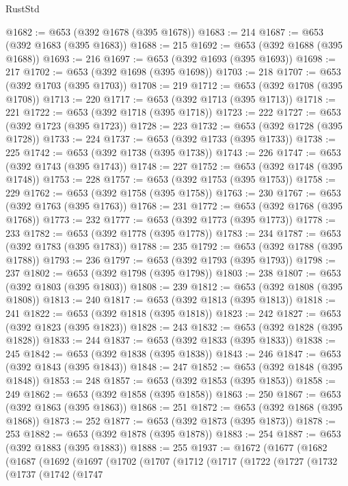 \begin{lexlean}{RustStd}
\begin{coremodule}
{\begin{coremodule}
{{{{{{{{{{{{@1682 := @653 (@392 @1678 (@395 @1678))
@1683 := 214
@1687 := @653 (@392 @1683 (@395 @1683))
@1688 := 215
@1692 := @653 (@392 @1688 (@395 @1688))
@1693 := 216
@1697 := @653 (@392 @1693 (@395 @1693))
@1698 := 217
@1702 := @653 (@392 @1698 (@395 @1698))
@1703 := 218
@1707 := @653 (@392 @1703 (@395 @1703))
@1708 := 219
@1712 := @653 (@392 @1708 (@395 @1708))
@1713 := 220
@1717 := @653 (@392 @1713 (@395 @1713))
@1718 := 221
@1722 := @653 (@392 @1718 (@395 @1718))
@1723 := 222
@1727 := @653 (@392 @1723 (@395 @1723))
@1728 := 223
@1732 := @653 (@392 @1728 (@395 @1728))
@1733 := 224
@1737 := @653 (@392 @1733 (@395 @1733))
@1738 := 225
@1742 := @653 (@392 @1738 (@395 @1738))
@1743 := 226
@1747 := @653 (@392 @1743 (@395 @1743))
@1748 := 227
@1752 := @653 (@392 @1748 (@395 @1748))
@1753 := 228
@1757 := @653 (@392 @1753 (@395 @1753))
@1758 := 229
@1762 := @653 (@392 @1758 (@395 @1758))
@1763 := 230
@1767 := @653 (@392 @1763 (@395 @1763))
@1768 := 231
@1772 := @653 (@392 @1768 (@395 @1768))
@1773 := 232
@1777 := @653 (@392 @1773 (@395 @1773))
@1778 := 233
@1782 := @653 (@392 @1778 (@395 @1778))
@1783 := 234
@1787 := @653 (@392 @1783 (@395 @1783))
@1788 := 235
@1792 := @653 (@392 @1788 (@395 @1788))
@1793 := 236
@1797 := @653 (@392 @1793 (@395 @1793))
@1798 := 237
@1802 := @653 (@392 @1798 (@395 @1798))
@1803 := 238
@1807 := @653 (@392 @1803 (@395 @1803))
@1808 := 239
@1812 := @653 (@392 @1808 (@395 @1808))
@1813 := 240
@1817 := @653 (@392 @1813 (@395 @1813))
@1818 := 241
@1822 := @653 (@392 @1818 (@395 @1818))
@1823 := 242
@1827 := @653 (@392 @1823 (@395 @1823))
@1828 := 243
@1832 := @653 (@392 @1828 (@395 @1828))
@1833 := 244
@1837 := @653 (@392 @1833 (@395 @1833))
@1838 := 245
@1842 := @653 (@392 @1838 (@395 @1838))
@1843 := 246
@1847 := @653 (@392 @1843 (@395 @1843))
@1848 := 247
@1852 := @653 (@392 @1848 (@395 @1848))
@1853 := 248
@1857 := @653 (@392 @1853 (@395 @1853))
@1858 := 249
@1862 := @653 (@392 @1858 (@395 @1858))
@1863 := 250
@1867 := @653 (@392 @1863 (@395 @1863))
@1868 := 251
@1872 := @653 (@392 @1868 (@395 @1868))
@1873 := 252
@1877 := @653 (@392 @1873 (@395 @1873))
@1878 := 253
@1882 := @653 (@392 @1878 (@395 @1878))
@1883 := 254
@1887 := @653 (@392 @1883 (@395 @1883))
@1888 := 255
@1937 := @1672
    (@1677
      (@1682
        (@1687
          (@1692
            (@1697
              (@1702
                (@1707
                  (@1712
                    (@1717
                      (@1722
                        (@1727
                          (@1732
                            (@1737
                              (@1742
                                (@1747
}}}}}}}}}}}}
\end{coremodule}}
\end{coremodule}
\end{lexlean}
